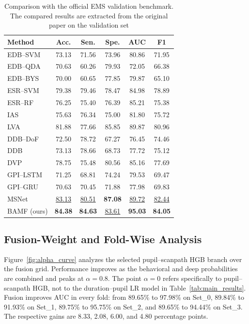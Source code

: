 \documentclass[conference,a4paper]{IEEEtran}
\begin{document}
\begin{table}[t]
\caption{Comparison with the official EMS validation benchmark. The compared results are extracted from the original paper \cite{song2024ems} on the validation set} 
\label{tab:benchmark}
\centering
\footnotesize
\setlength{\tabcolsep}{7.0pt}
\begin{tabular}{lccccc}
\toprule
Method & Acc. & Sen. & Spe. & AUC & F1 \\
\midrule
EDB--SVM & 73.13 & 71.56 & 73.96 & 80.86 & 71.95 \\
EDB--QDA & 70.63 & 60.26 & 79.93 & 72.05 & 66.38 \\
EDB--BYS & 70.00 & 60.65 & 77.85 & 79.87 & 65.10 \\
ESR--SVM & 79.38 & 79.46 & 78.47 & 84.98 & 78.89 \\
ESR--RF & 76.25 & 75.40 & 76.39 & 85.21 & 75.38 \\
IAS & 75.63 & 76.34 & 75.00 & 81.80 & 75.72 \\
LVA & 81.88 & 77.66 & 85.85 & 89.87 & 80.96 \\
DDB--DoF & 72.50 & 78.72 & 67.27 & 76.45 & 74.46 \\
DDB & 73.13 & 78.66 & 68.73 & 77.72 & 75.12 \\
DVP & 78.75 & 75.48 & 80.56 & 85.16 & 77.69 \\
GPI--LSTM & 71.25 & 68.81 & 74.24 & 79.53 & 69.47 \\
GPI--GRU & 70.63 & 70.45 & 71.88 & 77.98 & 69.83 \\
MSNet & \underline{83.13} & \underline{80.51} & \textbf{87.08} & \underline{89.72} & \underline{82.44} \\
\midrule
BAMF (ours) & \textbf{84.38} & \textbf{84.63} & \underline{83.61} & \textbf{95.03} & \textbf{84.05} \\
\bottomrule
\end{tabular}
\end{table}


\subsection{Fusion-Weight and Fold-Wise Analysis}
Figure~\ref{fig:alpha_curve} analyzes the selected pupil--scanpath HGB branch over the fusion grid. Performance improves as the behavioral and deep probabilities are combined and peaks at $\alpha=0.8$. The point $\alpha=0$ refers specifically to pupil--scanpath HGB, not to the duration--pupil LR model in Table~\ref{tab:main_results}. Fusion improves AUC in every fold: from 89.65\% to 97.98\% on Set\_0, 89.84\% to 91.93\% on Set\_1, 89.75\% to 95.75\% on Set\_2, and 89.65\% to 94.44\% on Set\_3. The respective gains are 8.33, 2.08, 6.00, and 4.80 percentage points.
\end{document}
